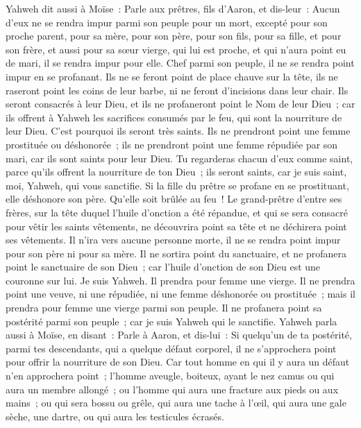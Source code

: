 \begin{multicols}{2}
\VerseOne{}Yahweh dit aussi à Moïse~: Parle aux prêtres, fils d'Aaron, et dis-leur~: Aucun d'eux ne se rendra impur parmi son peuple pour un mort,
excepté pour son proche parent, pour sa mère, pour son père, pour son fils, pour sa fille, et pour son frère,
et aussi pour sa sœur vierge, qui lui est proche, et qui n'aura point eu de mari, il se rendra impur pour elle.
Chef parmi son peuple, il ne se rendra point impur en se profanant.
Ils ne se feront point de place chauve sur la tête, ils ne raseront point les coins de leur barbe, ni ne feront d'incisions dans leur chair.
Ils seront consacrés à leur Dieu, et ils ne profaneront point le Nom de leur Dieu~; car ils offrent à Yahweh les sacrifices consumés par le feu, qui sont la nourriture de leur Dieu. C'est pourquoi ils seront très saints.
Ils ne prendront point une femme prostituée ou déshonorée~; ils ne prendront point une femme répudiée par son mari, car ils sont saints pour leur Dieu.
Tu regarderas chacun d'eux comme saint, parce qu'ils offrent la nourriture de ton Dieu~; ils seront saints, car je suis saint, moi, Yahweh, qui vous sanctifie.
Si la fille du prêtre se profane en se prostituant, elle déshonore son père. Qu'elle soit brûlée au feu~!
Le grand-prêtre d'entre ses frères, sur la tête duquel l'huile d'onction a été répandue, et qui se sera consacré pour vêtir les saints vêtements, ne découvrira point sa tête et ne déchirera point ses vêtements.
Il n'ira vers aucune personne morte, il ne se rendra point impur pour son père ni pour sa mère.
Il ne sortira point du sanctuaire, et ne profanera point le sanctuaire de son Dieu~; car l'huile d'onction de son Dieu est une couronne sur lui. Je suis Yahweh.
Il prendra pour femme une vierge.
Il ne prendra point une veuve, ni une répudiée, ni une femme déshonorée ou prostituée~; mais il prendra pour femme une vierge parmi son peuple.
Il ne profanera point sa postérité parmi son peuple~; car je suis Yahweh qui le sanctifie.
Yahweh parla aussi à Moïse, en disant~:
Parle à Aaron, et dis-lui~: Si quelqu'un de ta postérité, parmi tes descendants, qui a quelque défaut corporel, il ne s'approchera point pour offrir la nourriture de son Dieu.
Car tout homme en qui il y aura un défaut n'en approchera point~; l'homme aveugle, boiteux, ayant le nez camus ou qui aura un membre allongé~;
ou l'homme qui aura une fracture aux pieds ou aux mains~;
ou qui sera bossu ou grêle, qui aura une tache à l'œil, qui aura une gale sèche, une dartre, ou qui aura les testicules écrasés.

\end{multicols}
